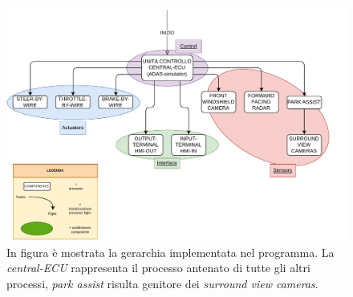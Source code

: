 \documentclass[11pt, openany]{article}
\theoremstyle{definition}
\theoremstyle{plain}
\theoremstyle{remark}
\begin{document}
				\begin{figure}[b!]
					\includegraphics[scale=0.7, center]{./include/SO_Progetto_Diagrammi-Gerarchia.pdf}
					\caption{In figura è mostrata la gerarchia implementata nel programma. La \textit{central-ECU} rappresenta il processo antenato di tutte gli altri processi, \textit{park assist} risulta genitore dei \textit{surround view cameras}.}
					\label{fig:gerarchia}
				\end{figure}
\end{document}
